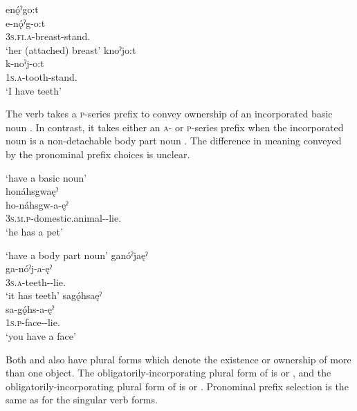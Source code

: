 \newpage
\ex enǫ́ˀgo:t\\
\gll e-nǫ́ˀg-o:t\\
 \textsc{3s.fi.a}-breast-stand.{\stative}\\
\glt `her (attached) breast'
\ex knoˀjo:t\\
\gll k-noˀj-o:t\\
 \textsc{1s.a}-tooth-stand.{\stative}\\
\glt `I have teeth'
\z
\z

The verb  takes a \textsc{p}-series prefix to convey ownership of an incorporated basic noun . In contrast, it takes either an \textsc{a}- or \textsc{p}-series prefix when the incorporated noun is a non-detachable body part noun . The difference in meaning conveyed by the pronominal prefix choices is unclear.

\ea\label{ex:posownex5}  ‘have a basic noun’\\
honáhsgwaęˀ\\
\gll ho-náhsgw-a-ęˀ\\
 \textsc{3s.m.p}-domestic.animal-{\joinerA}-lie.{\stative}\\
\glt `he has a pet'
\z


\ea\label{ex:posownex6}  ‘have a body part noun’
\ea ganóˀjaęˀ\\
\gll ga-nóˀj-a-ęˀ\\
 \textsc{3s.a}-teeth-{\joinerA}-lie.{\stative}\\
\glt `it has teeth'
\ex sagǫ́hsaęˀ\\
\gll sa-gǫ́hs-a-ęˀ\\
 \textsc{1s.p}-face-{\joinerA}-lie.{\stative}\\
\glt `you have a face'
\z
\z

Both  and  also have plural forms which denote the existence or ownership of more than one object. The obligatorily-incorporating plural form of  is  or  , and the obligatorily-incorporating plural form of  is  or  . Pronominal prefix selection is the same as for the singular verb forms.

